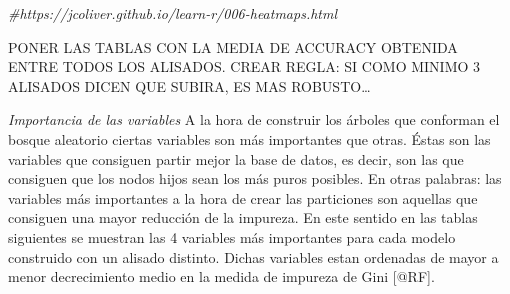 \documentclass[]{article}
\newenvironment{Shaded}{\begin{snugshade}}{\end{snugshade}}
\newcommand{\CommentTok}[1]{\textcolor[rgb]{0.56,0.35,0.01}{\textit{#1}}}
\begin{document}
\begin{Shaded}
\begin{Highlighting}[]
\CommentTok{#https://jcoliver.github.io/learn-r/006-heatmaps.html}
\end{Highlighting}
\end{Shaded}

PONER LAS TABLAS CON LA MEDIA DE ACCURACY OBTENIDA ENTRE TODOS LOS
ALISADOS. CREAR REGLA: SI COMO MINIMO 3 ALISADOS DICEN QUE SUBIRA, ES
MAS ROBUSTO\ldots{}

\emph{Importancia de las variables} A la hora de construir los árboles
que conforman el bosque aleatorio ciertas variables son más importantes
que otras. Éstas son las variables que consiguen partir mejor la base de
datos, es decir, son las que consiguen que los nodos hijos sean los más
puros posibles. En otras palabras: las variables más importantes a la
hora de crear las particiones son aquellas que consiguen una mayor
reducción de la impureza. En este sentido en las tablas siguientes se
muestran las 4 variables más importantes para cada modelo construido con
un alisado distinto. Dichas variables estan ordenadas de mayor a menor
decrecimiento medio en la medida de impureza de Gini {[}@RF{]}.
\end{document}
